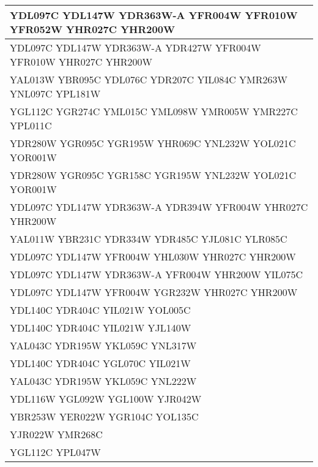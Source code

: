 \begin{longtable}{| m{27em} |}
\hline
YDL097C YDL147W YDR363W-A YFR004W YFR010W YFR052W YHR027C YHR200W \\
\hline
YDL097C YDL147W YDR363W-A YDR427W YFR004W YFR010W YHR027C YHR200W \\
\hline
YAL013W YBR095C YDL076C YDR207C YIL084C YMR263W YNL097C YPL181W \\
\hline
YGL112C YGR274C YML015C YML098W YMR005W YMR227C YPL011C \\
\hline
YDR280W YGR095C YGR195W YHR069C YNL232W YOL021C YOR001W \\
\hline
YDR280W YGR095C YGR158C YGR195W YNL232W YOL021C YOR001W \\
\hline
YDL097C YDL147W YDR363W-A YDR394W YFR004W YHR027C YHR200W \\
\hline
YAL011W YBR231C YDR334W YDR485C YJL081C YLR085C \\
\hline
YDL097C YDL147W YFR004W YHL030W YHR027C YHR200W \\
\hline
YDL097C YDL147W YDR363W-A YFR004W YHR200W YIL075C \\
\hline
YDL097C YDL147W YFR004W YGR232W YHR027C YHR200W \\
\hline
YDL140C YDR404C YIL021W YOL005C \\
\hline
YDL140C YDR404C YIL021W YJL140W \\
\hline
YAL043C YDR195W YKL059C YNL317W \\
\hline
YDL140C YDR404C YGL070C YIL021W \\
\hline
YAL043C YDR195W YKL059C YNL222W \\
\hline
YDL116W YGL092W YGL100W YJR042W \\
\hline
YBR253W YER022W YGR104C YOL135C \\
\hline
YJR022W YMR268C \\
\hline
YGL112C YPL047W \\
\hline
\end{longtable}
